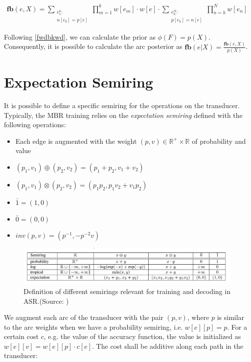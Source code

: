 \documentclass[a4paper,13.5pt]{extarticle}
\begin{document}
	\begin{align}
		\label{fwdbkwd}
		\mathbf{fb}(e, X)  = \sum_{\substack{e_1^k: \\ n[e_k] = p[e]}}\prod_{m=1}^k w[e_m] \cdot w[e] \cdot  \sum_{\substack{e_h^N: \\ p[e_h] = n[e]}}\prod_{n=h}^N w[e_n] 
	\end{align}
	
	Following \cref{fwdbkwd}, we can calculate the prior as $\phi(F) = p(X)$. Consequently, it is possible to calculate the arc posterior as $\mathbf{fb}(e | X) = \frac{	\mathbf{fb}(e, X)}{ p(X)}$.
	
	\section{Expectation Semiring}
	
	It is possible to define a specific semiring for the operations on the transducer. Typically, the MBR training relies on the \textit{expectation semiring}\cite{eisner2001expectation} defined with the following operations:
	
	\begin{itemize}
		\item  Each edge is augmented with the weight $(p,v) \in \mathbb{R}^+\times\mathbb{R}$ of probability and value
		\item $ (p_1,v_1)\oplus (p_2,v_2) = (p_1+p_2,v_1+v_2)$
		\item $ (p_1,v_1)\otimes (p_2,v_2)  = (p_1p_2, p_1v_2 + v_1p_2)$
		\item $\bar{1} = (1,0)$
		\item $\bar{0} = (0,0)$
		\item $inv(p,v) = (p^{-1}, - p^{-2}v)$
	\end{itemize} 
	
	
	
	
	\begin{figure}[t]
		\centering
		\caption*{Definition of different semirings relevant for training and decoding in ASR.(Source: \cite{hoffmeister2011wfst})}
		\includegraphics[width=1.\linewidth]{figures/semirings}	
	\end{figure}
	
	
	We augment each arc of the transducer with the pair $(p, v)$, where $p$ is similar to the arc weights when we have a probability semiring, i.e. $w[e][p] = p$. For a certain cost $c$, e.g. the value of the accuracy function, the value is initialized as $w[e][v] = w[e][p] \cdot c[e]$. The cost shall be additive along each path in the transducer:
	
\end{document}
